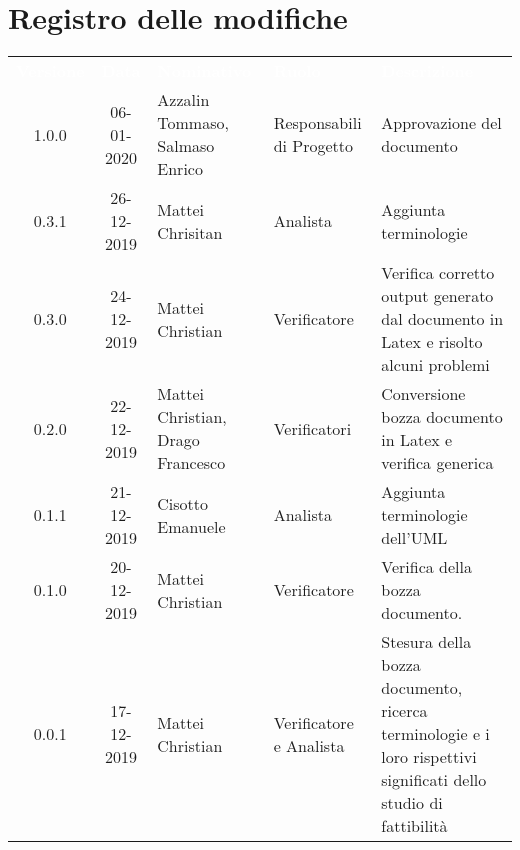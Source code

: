 \section*{Registro delle modifiche}
{
\renewcommand{\arraystretch}{1.5}
\centering
\begin{longtable}{ c c  C{4cm}  C{3cm} C{4cm}}
\textcolor{white}{\textbf{Versione}} & \textcolor{white}{\textbf{Data}} & \textcolor{white}{\textbf{Nominativo}} & \textcolor{white}{\textbf{Ruolo}} & \textcolor{white}{\textbf{Descrizione}}\\	


1.0.0 & 06-01-2020 & Azzalin Tommaso, Salmaso Enrico & Responsabili di Progetto & Approvazione del documento \\

0.3.1 & 26-12-2019 & Mattei Chrisitan & Analista & Aggiunta terminologie \\

0.3.0 & 24-12-2019 & Mattei Christian & Verificatore & Verifica corretto output generato dal documento in Latex e risolto alcuni problemi\\

0.2.0 & 22-12-2019 & Mattei Christian, Drago Francesco & Verificatori &  Conversione bozza documento in Latex e verifica generica\\

0.1.1 & 21-12-2019 & Cisotto Emanuele & Analista & Aggiunta terminologie dell'UML \\
		
0.1.0 & 20-12-2019 & Mattei Christian & Verificatore & Verifica della bozza documento.  \\
		
0.0.1 & 17-12-2019 & Mattei Christian & Verificatore e Analista & Stesura della bozza documento, ricerca terminologie e i loro rispettivi significati dello studio di fattibilità \\
		
		
\end{longtable}
}